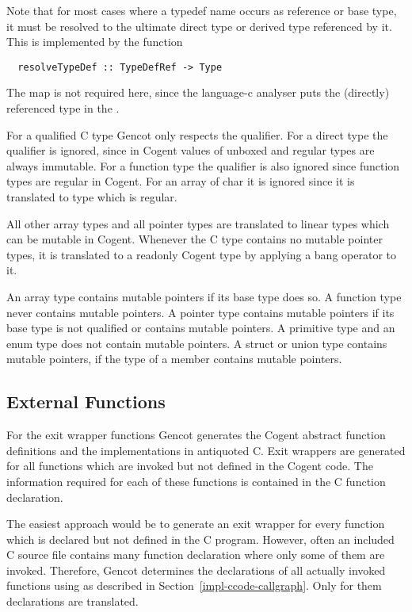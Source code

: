 Note that for most cases where a typedef name occurs as reference or base type, it must be resolved to
the ultimate direct type or derived type referenced by it. This is implemented by the function
\begin{verbatim}
  resolveTypeDef :: TypeDefRef -> Type 
\end{verbatim}
The  map is not required here, since the language-c analyser puts the (directly) 
referenced type in the . 

For a qualified C type Gencot only respects the  qualifier. For a direct type the 
qualifier is ignored, since in Cogent values of unboxed and regular types are always immutable. For
a function type the qualifier is also ignored since function types are regular in Cogent. For an array
of char it is ignored since it is translated to type  which is regular.

All other array types and all pointer types are translated to linear types which can be mutable in
Cogent. Whenever the C type contains no mutable pointer types, it is translated to a readonly Cogent type by 
applying a bang operator to it.

An array type contains mutable pointers if its base type does so. A function type never contains mutable pointers.
A pointer type contains mutable pointers if its base type is not  qualified or contains mutable pointers.
A primitive type and an enum type does not contain mutable pointers. A struct or union type contains mutable 
pointers, if the type of a member contains mutable pointers.

\subsection{External Functions}
\label{impl-ccomps-exit}

For the exit wrapper functions Gencot generates the Cogent abstract function definitions and the implementations
in antiquoted C. Exit wrappers are generated for all functions which are invoked but not defined in the Cogent code. 
The information required for each of these functions is contained in the C function declaration.

The easiest approach would be to generate an exit wrapper for every function which is declared but 
not defined in the C program. However, often an
included C source file contains many function declaration where only some of them are invoked. Therefore, Gencot
determines the declarations of all actually invoked functions using  as described in 
Section~\ref{impl-ccode-callgraph}. Only for them declarations are translated.

